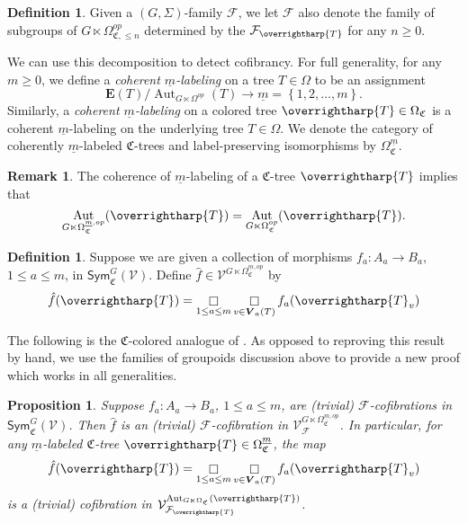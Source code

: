 \documentclass[a4paper,10pt
,draft
]{article}%
\numberwithin{equation}{section}
\numberwithin{figure}{section}
\newtheorem{proposition}[equation]{Proposition}%
\theoremstyle{definition} %
\newtheorem{definition}[equation]{Definition}%
\newtheorem{remark}[equation]{Remark}%
\newcommand{\set}[1]{\left\{#1\right\}}%
\newcommand{\longto}{\longrightarrow}%
\newcommand{\vect}[1]{\text{\overrightharp{\ensuremath{#1}}}}
\newcommand{\Sym}{\ensuremath{\mathsf{Sym}}}%
\DeclareMathOperator{\Aut}{Aut}%
\newcommand{\F}{\ensuremath{\mathcal F}}
\newcommand{\V}{\ensuremath{\mathcal V}}
\newcommand{\1}{\ensuremath{\mathbbm 1}}%
\begin{document}
\begin{definition}
      Given a $(G,\Sigma)$-family $\F$, we let $\F$ also denote the family of subgroups of $G \ltimes \Omega_{\mathfrak C, \leq n}^{op}$
      determined by the $\F_{\vect T}$ for any $n \geq 0$.
\end{definition}

We can use this decomposition to detect cofibrancy.
%
For full generality, for any $m \geq 0$, we define a \textit{coherent $\underline{m}$-labeling} on a tree $T \in \Omega$
to be an assignment
\[
      \boldsymbol{E}(T) / \Aut_{G \ltimes \Omega^{op}}(T) \longto \underline{m} = \set{1,2,\dots,m}.
\]
Similarly, a \textit{coherent $\underline{m}$-labeling} on a colored tree $\vect T \in \Omega_{\mathfrak C}$
is a coherent $\underline{m}$-labeling on the underlying tree $T \in \Omega$.
We denote the category of coherently $\underline{m}$-labeled $\mathfrak C$-trees and label-preserving isomorphisms by $\Omega^{\underline{m}}_{\mathfrak C}$.

\begin{remark}
      \label{COHMLBL_REM}
      The coherence of $\underline{m}$-labeling of a $\mathfrak C$-tree $\vect T$ implies that
      \[
            \Aut_{G \ltimes \Omega_{\mathfrak C}^{\underline{m},op}}(\vect T) = \Aut_{G \ltimes \Omega_{\mathfrak C}^{op}}(\vect T).
      \]
\end{remark}

\begin{definition}
      Suppose we are given a collection of morphisms $f_a: A_a \to B_a$, $1 \leq a \leq m$, in $\Sym_{\mathfrak C}^G(\V)$.
      Define $\hat f \in \V^{G \ltimes \Omega_{\mathfrak C}^{\underline{m},op}}$ by
      \[
            \hat f(\vect T) = \mathop{\square}\limits_{1 \leq a \leq m} \mathop{\square}\limits_{v \in \boldsymbol{V}_a(T)} f_a(\vect T_v)
      \]      
\end{definition}

The following is the $\mathfrak C$-colored analogue of \cite[Prop. 6.52]{BP_geo}.
As opposed to reproving this result by hand, we use the families of groupoids discussion above to provide a new proof which works in all generalities.

\begin{proposition}
      \label{BOXVT_PROP}
      Suppose $f_a: A_a \to B_a$, $1 \leq a \leq m$, are (trivial) $\F$-cofibrations in $\Sym_{\mathfrak C}^G(\V)$.
      Then $\hat f$ is an (trivial) $\F$-cofibration in $\V^{G \ltimes \Omega_{\mathfrak C}^{\underline{m},op}}_{\F}$.
      In particular, for any $\underline{m}$-labeled $\mathfrak C$-tree $\vect T \in \Omega^{\underline{m}}_{\mathfrak C}$, the map
      \[
            \hat f(\vect T) = \mathop{\square}\limits_{1 \leq a \leq m} \mathop{\square}\limits_{v \in \boldsymbol{V}_a(T)} f_a(\vect T_v)
      \]
      is a (trivial) cofibration in $\V^{\Aut_{G \ltimes \Omega_{\mathfrak C}}(\vect T)}_{\F_{\vect T}}$.
\end{proposition}
\end{document}
